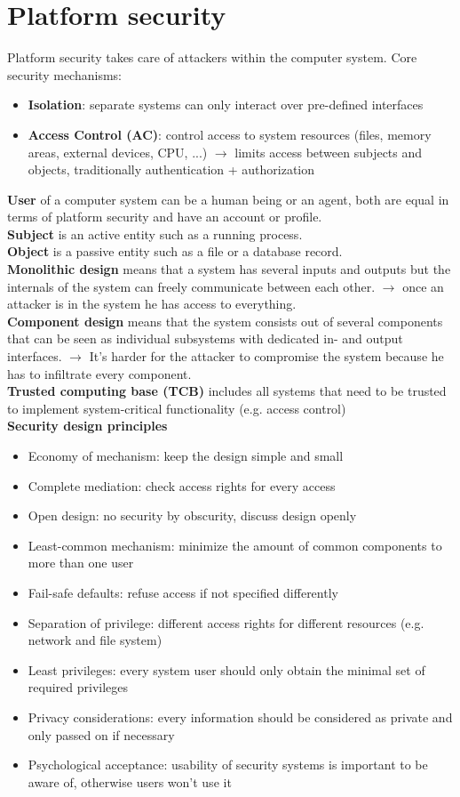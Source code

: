 \documentclass[12pt]{article}
\begin{document}
	\section{Platform security}
	Platform security takes care of attackers within the computer system. Core security mechanisms:
	\begin{itemize}
		\item \textbf{Isolation}: separate systems can only interact over pre-defined interfaces
		\item \textbf{Access Control (AC)}: control access to system resources (files, memory areas, external devices, CPU, ...) $\rightarrow$ limits access between subjects and objects, traditionally authentication + authorization
	\end{itemize}
	\textbf{User} of a computer system can be a human being or an agent, both are equal in terms of platform security and have an account or profile.\\
	\textbf{Subject} is an active entity such as a running process.\\
	\textbf{Object} is a passive entity such as a file or a database record.\\
	\textbf{Monolithic design} means that a system has several inputs and outputs but the internals of the system can freely communicate between each other. $\rightarrow$ once an attacker is in the system he has access to everything.\\
	\textbf{Component design} means that the system consists out of several components that can be seen as individual subsystems with dedicated in- and output interfaces. $\rightarrow$ It's harder for the attacker to compromise the system because he has to infiltrate every component.\\
	\textbf{Trusted computing base (TCB)} includes all systems that need to be trusted to implement system-critical functionality (e.g. access control)\\
	\textbf{Security design principles}
	\begin{itemize}
		\item Economy of mechanism: keep the design simple and small
		\item Complete mediation: check access rights for every access
		\item Open design: no security by obscurity, discuss design openly
		\item Least-common mechanism: minimize the amount of common components to more than one user
		\item Fail-safe defaults: refuse access if not specified differently
		\item Separation of privilege: different access rights for different resources (e.g. network and file system)
		\item Least privileges: every system user should only obtain the minimal set of required privileges
		\item Privacy considerations: every information should be considered as private and only passed on if necessary
		\item Psychological acceptance: usability of security systems is important to be aware of, otherwise users won't use it
	\end{itemize}
\end{document}
